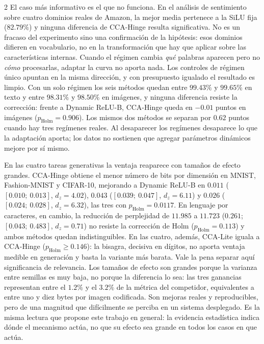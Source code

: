 \begin{multicols}{2}
El caso más informativo es el que no funciona. En el análisis de sentimiento sobre cuatro dominios reales de Amazon, la mejor media pertenece a la SiLU fija ($82.79\%$) y ninguna diferencia de CCA-Hinge resulta significativa. No es un fracaso del experimento sino una confirmación de la hipótesis: esos dominios difieren en vocabulario, no en la transformación que hay que aplicar sobre las características internas. Cuando el régimen cambia \textit{qué} palabras aparecen pero no \textit{cómo} procesarlas, adaptar la curva no aporta nada. Los controles de régimen único apuntan en la misma dirección, y con presupuesto igualado el resultado es limpio. Con un solo régimen los seis métodos quedan entre $99.43\%$ y $99.65\%$ en texto y entre $98.31\%$ y $98.50\%$ en imágenes, y ninguna diferencia resiste la corrección: frente a Dynamic ReLU-B, CCA-Hinge queda en $-0.01$ puntos en imágenes ($p_{\mathrm{Holm}}=0.906$). Los mismos dos métodos se separan por $0.62$ puntos cuando hay tres regímenes reales. Al desaparecer los regímenes desaparece lo que la adaptación aporta; los datos no sostienen que agregar parámetros dinámicos mejore por sí mismo.

En las cuatro tareas generativas la ventaja reaparece con tamaños de efecto grandes. CCA-Hinge obtiene el menor número de bits por dimensión en MNIST, Fashion-MNIST y CIFAR-10, mejorando a Dynamic ReLU-B en $0.011$ ($[0.010;\ 0.013]$, $d_z=4.02$), $0.043$ ($[0.039;\ 0.047]$, $d_z=6.11$) y $0.026$ ($[0.024;\ 0.028]$, $d_z=6.32$), las tres con $p_{\mathrm{Holm}}=0.0117$. En lenguaje por caracteres, en cambio, la reducción de perplejidad de $11.985$ a $11.723$ ($0.261$; $[0.043;\ 0.483]$, $d_z=0.71$) no resiste la corrección de Holm ($p_{\mathrm{Holm}}=0.113$) y ambos métodos quedan indistinguibles. En las cuatro, además, CCA-Lite iguala a CCA-Hinge ($p_{\mathrm{Holm}}\ge0.146$): la bisagra, decisiva en dígitos, no aporta ventaja medible en generación y basta la variante más barata. Vale la pena separar aquí significancia de relevancia. Los tamaños de efecto son grandes porque la varianza entre semillas es muy baja, no porque la diferencia lo sea: las tres ganancias representan entre el $1.2\%$ y el $3.2\%$ de la métrica del competidor, equivalentes a entre uno y diez bytes por imagen codificada. Son mejoras reales y reproducibles, pero de una magnitud que difícilmente se perciba en un sistema desplegado. Es la misma lectura que propone este trabajo en general: la evidencia estadística indica dónde el mecanismo actúa, no que su efecto sea grande en todos los casos en que actúa.


\end{multicols}
